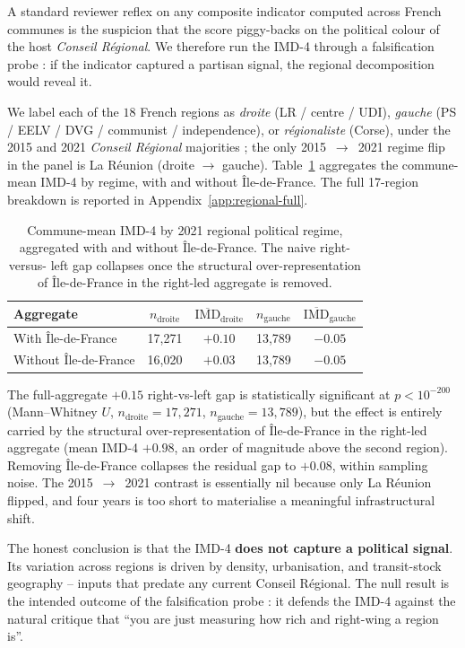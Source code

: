 \documentclass[11pt,a4paper]{article}
\newcommand{\IMD}{\mathrm{IMD}}
\begin{document}
A standard reviewer reflex on any composite indicator computed
across French communes is the suspicion that the score
piggy-backs on the political colour of the host \emph{Conseil
R\'egional}.  We therefore run the IMD-4 through a falsification
probe : if the indicator captured a partisan signal, the regional
decomposition would reveal it.

We label each of the $18$ French regions as \emph{droite}
(LR / centre / UDI), \emph{gauche} (PS / EELV / DVG /
communist / independence), or \emph{r\'egionaliste} (Corse), under
the 2015 and 2021 \emph{Conseil R\'egional} majorities ; the only
2015~$\to$~2021 regime flip in the panel is La R\'eunion (droite
$\to$ gauche).  Table~\ref{tab:regional-summary} aggregates the
commune-mean IMD-4 by regime, with and without \^Ile-de-France.
The full 17-region breakdown is reported in
Appendix~\ref{app:regional-full}.

\begin{table}[H]
\centering
\caption{Commune-mean IMD-4 by 2021 regional political regime,
aggregated with and without \^Ile-de-France.  The naive right-versus-
left gap collapses once the structural over-representation of
\^Ile-de-France in the right-led aggregate is removed.}
\label{tab:regional-summary}
\small
\begin{tabular}{@{}lcccc@{}}
\toprule
Aggregate & $n_{\text{droite}}$ & $\overline{\IMD}_{\text{droite}}$
          & $n_{\text{gauche}}$ & $\overline{\IMD}_{\text{gauche}}$\\
\midrule
With \^Ile-de-France    & 17{,}271 & $+0.10$ & 13{,}789 & $-0.05$ \\
Without \^Ile-de-France & 16{,}020 & $+0.03$ & 13{,}789 & $-0.05$ \\
\bottomrule
\end{tabular}
\end{table}

The full-aggregate $+0.15$ right-vs-left gap is statistically
significant at $p < 10^{-200}$ (Mann--Whitney $U$, $n_{\text{droite}}
= 17{,}271$, $n_{\text{gauche}} = 13{,}789$), but the effect is
entirely carried by the structural over-representation of
\^Ile-de-France in the right-led aggregate (mean IMD-4 $+0.98$, an
order of magnitude above the second region).  Removing
\^Ile-de-France collapses the residual gap to $+0.08$, within
sampling noise.  The 2015~$\to$~2021 contrast is essentially nil
because only La R\'eunion flipped, and four years is too short to
materialise a meaningful infrastructural shift.

The honest conclusion is that the IMD-4 \textbf{does not capture
a political signal}.  Its variation across regions is driven by
density, urbanisation, and transit-stock geography -- inputs that
predate any current Conseil R\'egional.  The null result is the
intended outcome of the falsification probe : it defends the IMD-4
against the natural critique that ``you are just measuring how rich
and right-wing a region is''.
\end{document}
